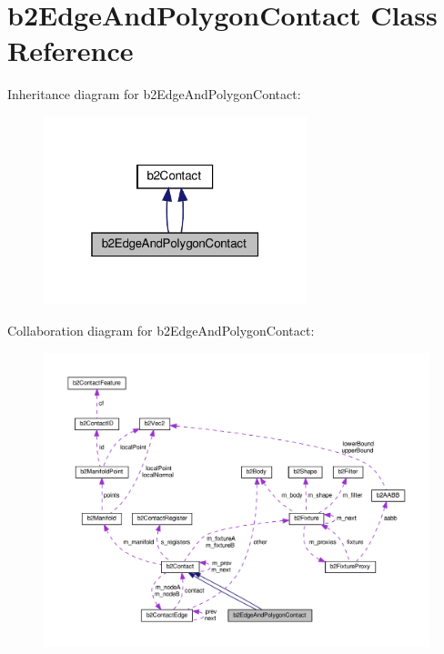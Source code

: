 \hypertarget{classb2EdgeAndPolygonContact}{}\section{b2\+Edge\+And\+Polygon\+Contact Class Reference}
\label{classb2EdgeAndPolygonContact}


Inheritance diagram for b2\+Edge\+And\+Polygon\+Contact\+:
\nopagebreak
\begin{figure}[H]
\begin{center}
\leavevmode
\includegraphics[width=217pt]{classb2EdgeAndPolygonContact__inherit__graph}
\end{center}
\end{figure}


Collaboration diagram for b2\+Edge\+And\+Polygon\+Contact\+:
\nopagebreak
\begin{figure}[H]
\begin{center}
\leavevmode
\includegraphics[width=350pt]{classb2EdgeAndPolygonContact__coll__graph}
\end{center}
\end{figure}
